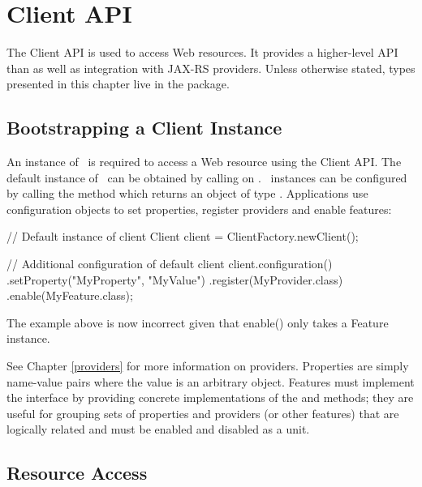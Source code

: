 \chapter{Client API}
\label{client_api}

The Client API is used to access Web resources. It provides a higher-level API than  as well as integration with JAX-RS providers. Unless otherwise stated, types presented in this chapter live in the  package.

\section{Bootstrapping a Client Instance}

An instance of \Client\ is required to access a Web resource using the Client API. The default instance of \Client\ can be obtained by calling  on \ClientFactory. \Client\ instances can be configured by calling the  method which returns an object
of type . Applications use configuration objects to set properties, register providers and enable features:

\begin{listing}{1}
// Default instance of client
Client client = ClientFactory.newClient();

// Additional configuration of default client
client.configuration()
    .setProperty("MyProperty", "MyValue")
    .register(MyProvider.class)
    .enable(MyFeature.class);
\end{listing}

\begin{ednote}
The example above is now incorrect given that enable() only takes a Feature instance.
\end{ednote}

See Chapter \ref{providers} for more information on providers. Properties are simply name-value pairs where the value is an arbitrary object.  Features must implement the  interface by providing concrete implementations of the  and  methods; they are useful for grouping sets of properties and providers (or other features) that are logically related and must be enabled and disabled as a unit.

\section{Resource Access}
\label{resource_access}

